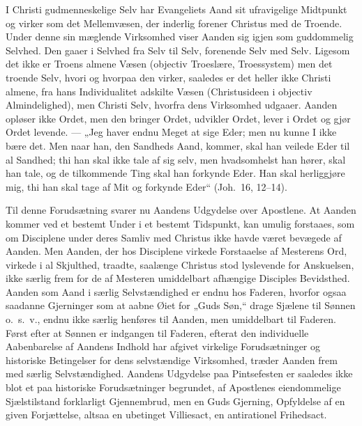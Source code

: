 \documentclass[12pt]{book}
\begin{document}
I Christi gudmenneskelige Selv har Evangeliets Aand sit
ufravigelige Midtpunkt og virker som det Mellemvæsen, der inderlig
forener Christus med de Troende. Under denne sin mæglende
Virksomhed viser Aanden sig igjen som guddommelig Selvhed. Den gaaer
i Selvhed fra Selv til Selv, forenende Selv med Selv. Ligesom det
ikke er Troens almene Væsen (objectiv Troeslære, Troessystem) men
det troende Selv, hvori og hvorpaa den virker, saaledes er det
heller ikke Christi almene, fra hans Individualitet adskilte Væsen
(Christusideen i objectiv Almindelighed), men Christi Selv, hvorfra
dens Virksomhed udgaaer. Aanden opløser ikke Ordet, men den bringer
Ordet, udvikler Ordet, lever i Ordet og gjør Ordet levende. --- „Jeg
haver endnu Meget at sige Eder; men nu kunne I ikke bære det. Men
naar han, den Sandheds Aand, kommer, skal han veilede Eder til al
Sandhed; thi han skal ikke tale af sig selv, men hvadsomhelst han
hører, skal han tale, og de tilkommende Ting skal han forkynde Eder.
Han skal herliggjøre mig, thi han skal tage af Mit og forkynde
Eder“ (Joh.\ 16, 12--14).

Til denne Forudsætning svarer nu Aandens Udgydelse over Apostlene.
At Aanden kommer ved et bestemt Under i et bestemt Tidspunkt, kan
umulig forstaaes, som om Disciplene under deres Samliv med Christus
ikke havde været bevægede af Aanden. Men Aanden, der hos Disciplene
virkede Forstaaelse af Mesterens Ord, virkede i al Skjulthed,
traadte, saalænge Christus stod lyslevende for Anskuelsen, ikke
særlig frem for de af Mesteren umiddelbart afhængige Disciples
Bevidsthed.
Aanden som Aand i særlig Selvstændighed er endnu hos Faderen,
hvorfor ogsaa saadanne Gjerninger som at aabne Øiet for „Guds
Søn,“ drage Sjælene til Sønnen o.\ s.\ v., endnu ikke særlig
henføres til Aanden, men umiddelbart til Faderen. Først efter at
Sønnen er indgangen til Faderen, efterat den individuelle
Aabenbarelse af Aandens Indhold har afgivet virkelige Forudsætninger
og historiske Betingelser for dens selvstændige Virksomhed, træder
Aanden frem med særlig Selvstændighed. Aandens Udgydelse paa
Pintsefesten er saaledes ikke blot et paa historiske Forudsætninger
begrundet, af Apostlenes eiendommelige Sjælstilstand forklarligt
Gjennembrud, men en Guds Gjerning, Opfyldelse af en given
Forjættelse, altsaa en ubetinget Villiesact, en antirationel
Frihedsact.
\end{document}
